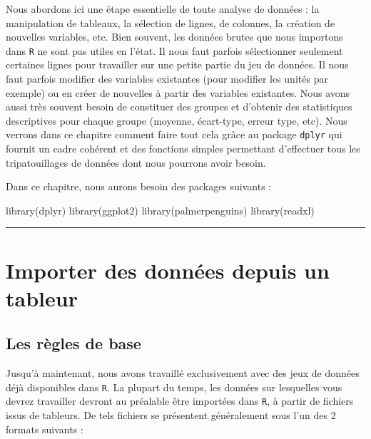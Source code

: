 \documentclass[
  a4paper,
  DIV=11,
  numbers=noendperiod,
  oneside]{scrreprt}
\newenvironment{Shaded}{}{}
\newcommand{\FunctionTok}[1]{\textcolor[rgb]{0.44,0.26,0.76}{#1}}
\newcommand{\NormalTok}[1]{\textcolor[rgb]{0.14,0.16,0.18}{#1}}
\begin{document}
Nous abordons ici une étape essentielle de toute analyse de données : la
manipulation de tableaux, la sélection de lignes, de colonnes, la
création de nouvelles variables, etc. Bien souvent, les données brutes
que nous importons dans \texttt{R} ne sont pas utiles en l'état. Il nous
faut parfois sélectionner seulement certaines lignes pour travailler sur
une petite partie du jeu de données. Il nous faut parfois modifier des
variables existantes (pour modifier les unités par exemple) ou en créer
de nouvelles à partir des variables existantes. Nous avons aussi très
souvent besoin de constituer des groupes et d'obtenir des statistiques
descriptives pour chaque groupe (moyenne, écart-type, erreur type, etc).
Nous verrons dans ce chapitre comment faire tout cela grâce au package
\texttt{dplyr} qui fournit un cadre cohérent et des fonctions simples
permettant d'effectuer tous les tripatouillages de données dont nous
pourrons avoir besoin.

Dans ce chapitre, nous aurons besoin des packages suivants :

\begin{Shaded}
\begin{Highlighting}[]
\FunctionTok{library}\NormalTok{(dplyr)}
\FunctionTok{library}\NormalTok{(ggplot2)}
\FunctionTok{library}\NormalTok{(palmerpenguins)}
\FunctionTok{library}\NormalTok{(readxl)}
\end{Highlighting}
\end{Shaded}

\begin{center}\rule{0.5\linewidth}{0.5pt}\end{center}

\section{Importer des données depuis un
tableur}\label{importer-des-donnuxe9es-depuis-un-tableur}

\subsection{Les règles de base}\label{les-ruxe8gles-de-base}

Jusqu'à maintenant, nous avons travaillé exclusivement avec des jeux de
données déjà disponibles dans \texttt{R}. La plupart du temps, les
données sur lesquelles vous devrez travailler devront au préalable être
importées dans \texttt{R}, à partir de fichiers issus de tableurs. De
tels fichiers se présentent généralement sous l'un des 2 formats
suivants :
\end{document}
